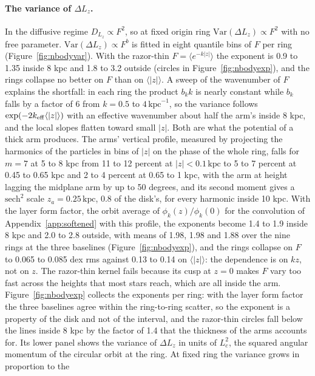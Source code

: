 \documentclass[twocolumn]{aastex701}
\newcommand{\Lz}{L_z}
\newcommand{\kpc}{\,\mathrm{kpc}}
\begin{document}
\paragraph{The variance of $\Delta\Lz$.} In the diffusive regime $D_{\Lz}\propto F^2$,
so at fixed origin ring $\mathrm{Var}(\Delta\Lz)\propto F^2$ with no free parameter.
$\mathrm{Var}(\Delta\Lz)\propto F^{b}$ is fitted in eight quantile bins of $F$ per ring
(Figure~\ref{fig:nbodyvar}). With the razor-thin $F=\langle e^{-k|z|}\rangle$ the
exponent is 0.9 to 1.35 inside 8 kpc and 1.8 to 3.2 outside (circles in
Figure~\ref{fig:nbodyexp}), and the rings collapse no better on $F$ than on
$\langle|z|\rangle$. A sweep of the wavenumber of $F$ explains the shortfall: in each
ring the product $b_k k$ is nearly constant while $b_k$ falls by a factor of 6 from
$k=0.5$ to $4\kpc^{-1}$, so the variance follows $\exp(-2k_{\rm eff}\langle|z|\rangle)$
with an effective wavenumber about half the arm's inside 8 kpc, and the local slopes
flatten toward small $|z|$. Both are what the potential of a thick arm produces. The
arms' vertical profile, measured by projecting the harmonics of the particles in bins
of $|z|$ on the phase of the whole ring, falls for $m=7$ at 5 to 8 kpc from 11 to 12
percent at $|z|<0.1\kpc$ to 5 to 7 percent at 0.45 to 0.65 kpc and 2 to 4 percent at
0.65 to 1 kpc, with the arm at height lagging the midplane arm by up to 50 degrees,
and its second moment gives a $\mathrm{sech}^2$ scale $z_a=0.25\kpc$, 0.8 of the
disk's, for every harmonic inside 10 kpc. With the layer form factor, the orbit average
of $\phi_k(z)/\phi_k(0)$ for the convolution of Appendix~\ref{app:softened} with this
profile, the exponents become 1.4 to 1.9 inside 8 kpc and 2.0 to 2.8 outside, with
means of 1.98, 1.98 and 1.88 over the nine rings at the three baselines
(Figure~\ref{fig:nbodyexp}), and the rings collapse on $F$ to 0.065 to 0.085 dex rms
against 0.13 to 0.14 on $\langle|z|\rangle$: the dependence is on $kz$, not on $z$. The
razor-thin kernel fails because its cusp at $z=0$ makes $F$ vary too fast across the
heights that most stars reach, which are all inside the arm. Figure~\ref{fig:nbodyexp}
collects the exponents per ring: with the layer form factor the three baselines agree
within the ring-to-ring scatter, so the exponent is a property of the disk and not of
the interval, and the razor-thin circles fall below the lines inside 8 kpc by the
factor of 1.4 that the thickness of the arms accounts for. Its lower panel shows the
variance of $\Delta\Lz$ in units of $L_c^2$, the squared angular momentum of the
circular orbit at the ring. At fixed ring the variance grows in proportion to the
\end{document}
